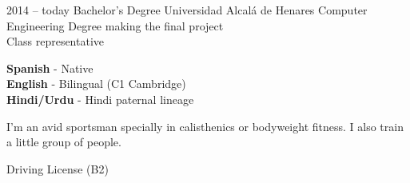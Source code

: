 \documentclass[9pt]{developercv} %
\begin{document}


\begin{entrylist}
	\entry
		{2014 -- today}
		{Bachelor's Degree}
		{Universidad Alcalá de Henares}
		{Computer Engineering Degree making the final project\\ Class representative}
\end{entrylist}


\begin{minipage}[t]{0.3\textwidth}
	\vspace{-\baselineskip} %

	
	\textbf{Spanish} - Native\\
	\textbf{English} - Bilingual (C1 Cambridge)\\
	\textbf{Hindi/Urdu} - Hindi paternal lineage
\end{minipage}
\hfill
\begin{minipage}[t]{0.3\textwidth}
	\vspace{-\baselineskip} %
	
	
	I'm an avid sportsman specially in calisthenics or bodyweight fitness. I also train a little group of people. 
\end{minipage}
\hfill
\begin{minipage}[t]{0.3\textwidth}
	\vspace{-\baselineskip} %
	
	
	Driving License (B2)
\end{minipage}

\end{document}
